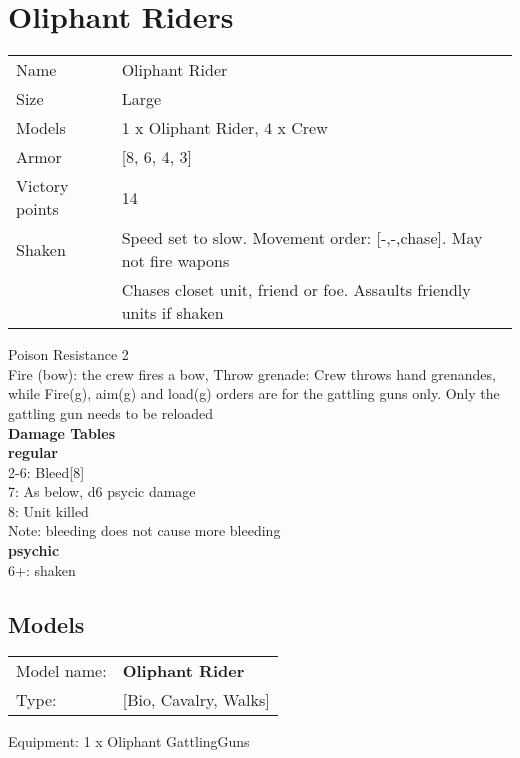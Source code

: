 \pagebreak

\section{ Oliphant Riders }

\begin{tabular}{ll}
  Name & Oliphant Rider \\
  Size & Large\\
  Models & 1 x Oliphant Rider, 4 x Crew\\
  Armor & [8, 6, 4, 3]\\
  Victory points & 14\\
  Shaken & Speed set to slow. Movement order: [-,-,chase]. May not fire wapons\\ &Chases closet unit, friend or foe. Assaults friendly units if shaken\\
\end{tabular}

Poison Resistance 2\\ 
Fire (bow): the crew fires a bow, Throw grenade: Crew throws hand grenandes, while Fire(g), aim(g) and load(g) orders are for the gattling guns only. Only the gattling gun needs to be reloaded\\ 



{\bf Damage Tables} \\
 {\bf regular } \\
2-6: Bleed[8]  \\
7: As below, d6 psycic damage \\
8: Unit killed \\
Note: bleeding does not cause more bleeding \\
 {\bf psychic } \\
6+: shaken \\


\pagebreak

\subsection{ Models }

\begin{tabular}{ll}
Model name: & {\bf Oliphant Rider } \\
Type: & [Bio, Cavalry, Walks] \\
\end{tabular}

Equipment: 1 x Oliphant GattlingGuns \\

